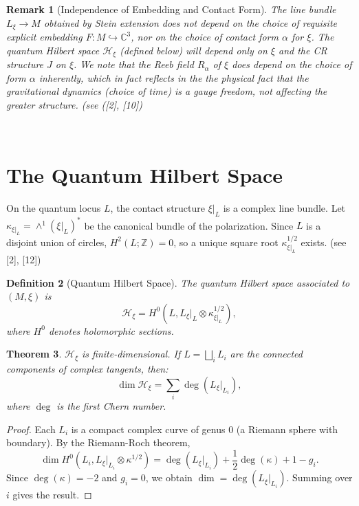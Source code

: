 \documentclass[12pt]{article}
\newtheorem{theorem}{Theorem}[section]
\newtheorem{definition}[theorem]{Definition}
\newtheorem{remark}[theorem]{Remark}
\newcommand{\C}{\mathbb{C}}
\newcommand{\Z}{\mathbb{Z}}
\newcommand{\Hilb}{\mathcal{H}}
\begin{document}
\begin{remark}[Independence of Embedding and Contact Form] The line bundle $L_\xi \to M$ obtained by Stein extension does not depend on the choice of requisite explicit embedding $F: M \hookrightarrow \C^3$, nor on the choice of contact form $\alpha$ for $\xi$. The quantum Hilbert space $\mathcal{H}_\xi$  (defined below) will depend only on $\xi$ and the CR structure $J$ on $\xi$. We note that the Reeb field $R_\alpha$ of $\xi$ does depend on the choice of form $\alpha$ inherently, which in fact reflects in the the physical fact that the gravitational dynamics (choice of time) is a gauge freedom, not affecting the greater structure.  (see ([2], [10]) \end{remark} 
\par\
\section{The Quantum Hilbert Space}

On the quantum locus $L$, the contact structure $\xi|_L$ is a complex line bundle. Let $\kappa_{\xi|_L} = \wedge^1 (\xi|_L)^*$ be the canonical bundle of the polarization. Since $L$ is a disjoint union of circles, $H^2(L;\Z) = 0$, so a unique square root $\kappa_{\xi|_L}^{1/2}$ exists.  (see [2], [12])

\begin{definition}[Quantum Hilbert Space]
The quantum Hilbert space associated to $(M,\xi)$ is
\[
\Hilb_\xi = H^0(L, L_\xi|_L \otimes \kappa_{\xi|_L}^{1/2}),
\]
where $H^0$ denotes holomorphic sections.
\end{definition}

\begin{theorem}
$\Hilb_\xi$ is finite-dimensional. If $L = \bigsqcup_i L_i$ are the connected components of complex tangents, then:
\[
\dim \Hilb_\xi = \sum_i \deg(L_\xi|_{L_i}),
\]
where $\deg$ is the first Chern number.
\end{theorem}

\begin{proof}
Each $L_i$ is a compact complex curve of genus $0$ (a Riemann sphere with boundary). By the Riemann-Roch theorem,
\[
\dim H^0(L_i, L_\xi|_{L_i} \otimes \kappa^{1/2}) = \deg(L_\xi|_{L_i}) + \frac{1}{2}\deg(\kappa) + 1 - g_i.
\]
Since $\deg(\kappa) = -2$ and $g_i = 0$, we obtain $\dim = \deg(L_\xi|_{L_i})$. Summing over $i$ gives the result.
\end{proof}
\end{document}
